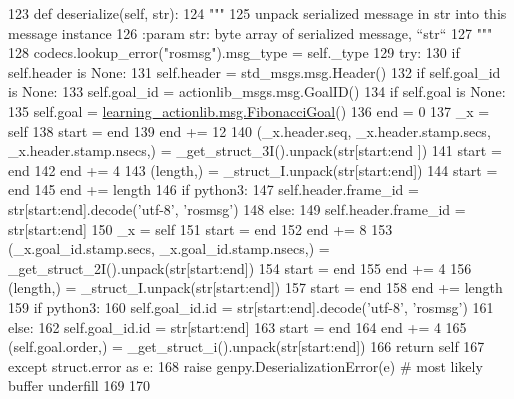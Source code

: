 \begin{DoxyCode}
123   \textcolor{keyword}{def }deserialize(self, str):
124     \textcolor{stringliteral}{"""}
125 \textcolor{stringliteral}{    unpack serialized message in str into this message instance}
126 \textcolor{stringliteral}{    :param str: byte array of serialized message, ``str``}
127 \textcolor{stringliteral}{    """}
128     codecs.lookup\_error(\textcolor{stringliteral}{"rosmsg"}).msg\_type = self.\_type
129     \textcolor{keywordflow}{try}:
130       \textcolor{keywordflow}{if} self.header \textcolor{keywordflow}{is} \textcolor{keywordtype}{None}:
131         self.header = std\_msgs.msg.Header()
132       \textcolor{keywordflow}{if} self.goal\_id \textcolor{keywordflow}{is} \textcolor{keywordtype}{None}:
133         self.goal\_id = actionlib\_msgs.msg.GoalID()
134       \textcolor{keywordflow}{if} self.goal \textcolor{keywordflow}{is} \textcolor{keywordtype}{None}:
135         self.goal = \hyperlink{classlearning__actionlib_1_1msg_1_1__FibonacciGoal_1_1FibonacciGoal}{learning\_actionlib.msg.FibonacciGoal}()
136       end = 0
137       \_x = self
138       start = end
139       end += 12
140       (\_x.header.seq, \_x.header.stamp.secs, \_x.header.stamp.nsecs,) = \_get\_struct\_3I().unpack(str[start:end
      ])
141       start = end
142       end += 4
143       (length,) = \_struct\_I.unpack(str[start:end])
144       start = end
145       end += length
146       \textcolor{keywordflow}{if} python3:
147         self.header.frame\_id = str[start:end].decode(\textcolor{stringliteral}{'utf-8'}, \textcolor{stringliteral}{'rosmsg'})
148       \textcolor{keywordflow}{else}:
149         self.header.frame\_id = str[start:end]
150       \_x = self
151       start = end
152       end += 8
153       (\_x.goal\_id.stamp.secs, \_x.goal\_id.stamp.nsecs,) = \_get\_struct\_2I().unpack(str[start:end])
154       start = end
155       end += 4
156       (length,) = \_struct\_I.unpack(str[start:end])
157       start = end
158       end += length
159       \textcolor{keywordflow}{if} python3:
160         self.goal\_id.id = str[start:end].decode(\textcolor{stringliteral}{'utf-8'}, \textcolor{stringliteral}{'rosmsg'})
161       \textcolor{keywordflow}{else}:
162         self.goal\_id.id = str[start:end]
163       start = end
164       end += 4
165       (self.goal.order,) = \_get\_struct\_i().unpack(str[start:end])
166       \textcolor{keywordflow}{return} self
167     \textcolor{keywordflow}{except} struct.error \textcolor{keyword}{as} e:
168       \textcolor{keywordflow}{raise} genpy.DeserializationError(e)  \textcolor{comment}{# most likely buffer underfill}
169 
170 
\end{DoxyCode}
